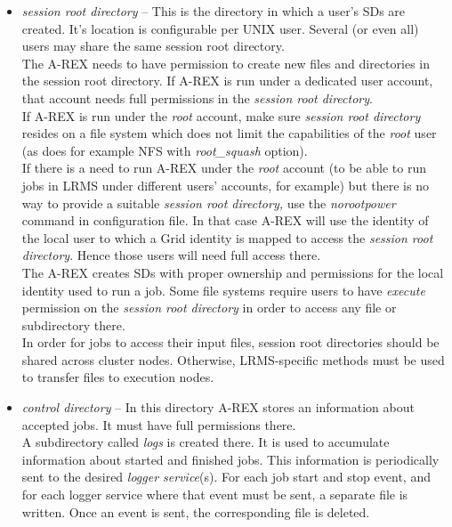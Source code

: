 \documentclass{article}                            %
\begin{document}
\begin{itemize}
\item \textit{session root directory} -- This is the directory in which a
user's SDs are created. It's location is configurable per UNIX user.
Several (or even all) users may share the same session root directory.\\
The A-REX needs to have permission to create new files and directories
in the session root directory. If A-REX is run under a dedicated user
account, that account needs full permissions in the \textit{session
root directory}.\\
If A-REX is run under the \emph{root} account, make sure \textit{session
root directory} resides on a file system which does not limit the
capabilities of the \emph{root} user (as does for example NFS with
\emph{root\_squash} option).\\
If there is a need to run A-REX under the \emph{root} account (to
be able to run jobs in LRMS under different users' accounts, for example)
but there is no way to provide a suitable \textit{session root directory,}
use the \emph{norootpower} command in configuration file. In that
case A-REX will use the identity of the local user to which a Grid
identity is mapped to access the \textit{session root directory}.
Hence those users will need full access there.\\
The A-REX creates SDs with proper ownership and permissions for the
local identity used to run a job. Some file systems require users
to have \emph{execute} permission on the \textit{session root directory}
in order to access any file or subdirectory there.\\
In order for jobs to access their input files, session root directories
should be shared across cluster nodes. Otherwise, LRMS-specific methods
must be used to transfer files to execution nodes. 
\end{itemize}

\begin{itemize}
\item \textit{control directory} -- In this directory A-REX stores an information
about accepted jobs. It must have full permissions there.\\
A subdirectory called \textit{logs} is created there. It is used to
accumulate information about started and finished jobs. This information
is periodically sent to the desired \emph{logger service}(s). For
each job start and stop event, and for each logger service where that
event must be sent, a separate file is written. Once an event is sent,
the corresponding file is deleted.
\end{itemize}
\end{document}
